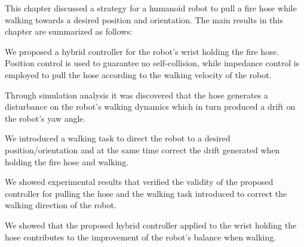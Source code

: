 This chapter discussed a strategy for a humanoid robot to pull a fire hose while walking towards a desired position and orientation.
%
The main results in this chapter are summarized as follows:
%
%
\begin{list}{ .}{%
		\setlength{\topsep}{5pt}%
		\setlength{\itemsep}{0pt}%
		\setlength{\parsep}{0pt}%
		\setlength{\labelwidth}{3.em}%
		\setlength{\leftmargin}{2em}%
		\setlength{\labelsep}{0.5em}%
	}

\item We proposed a hybrid controller for the robot's wrist holding the fire hose. Position control is used to guarantee no self-collision, while impedance control is employed to pull the hose according to the walking velocity of the robot.

\item Through simulation analysis it was discovered that the hose generates a disturbance on the robot's walking dynamics which in turn produced a drift on the robot's yaw angle.

\item We introduced a walking task to direct the robot to a desired position/orientation and at the same time correct the drift generated when holding the fire hose and walking.

\item We showed experimental results that verified the validity of the proposed controller for pulling the hose and the walking task introduced to correct the walking direction of the robot.

\item We showed that the proposed hybrid controller applied to the wrist holding the hose contributes to the improvement of the robot's balance when walking.

\end{list}
